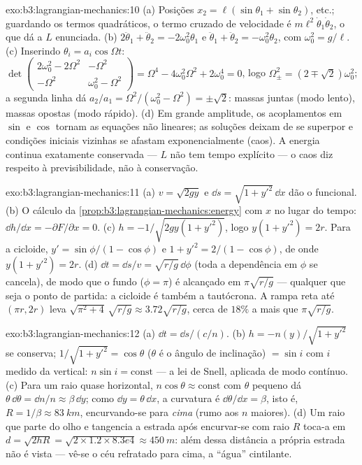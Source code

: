 \begin{solution}{exo:b3:lagrangian-mechanics:10}
(a) Posições $x_2 = \ell(\sin\theta_1 + \sin\theta_2)$, etc.; guardando
os termos quadráticos, o termo cruzado de velocidade é
$m\ell^2\dot\theta_1\dot\theta_2$, o que dá a $L$ enunciada. (b)
$2\ddot\theta_1 + \ddot\theta_2 = -2\omega_0^2\theta_1$ e
$\ddot\theta_1 + \ddot\theta_2 = -\omega_0^2\theta_2$, com $\omega_0^2
= g/\ell$. (c) Inserindo $\theta_i = a_i\cos\Omega t$:
$\det\begin{pmatrix} 2\omega_0^2 - 2\Omega^2 & -\Omega^2\\ -\Omega^2 &
\omega_0^2 - \Omega^2\end{pmatrix} = \Omega^4 - 4\omega_0^2\Omega^2 +
2\omega_0^4 = 0$, logo $\Omega_\pm^2 = (2 \mp \sqrt2)\omega_0^2$; a
segunda linha dá $a_2/a_1 = \Omega^2/(\omega_0^2 - \Omega^2) =
\pm\sqrt2$: massas juntas (modo lento), massas opostas (modo rápido).
(d) Em grande amplitude, os acoplamentos em $\sin$ e $\cos$ tornam as
equações não lineares; as soluções deixam de se superpor e condições
iniciais vizinhas se afastam exponencialmente (caos). A energia
continua exatamente conservada --- $L$ não tem tempo explícito --- o
caos diz respeito à previsibilidade, não à conservação.
\end{solution}

\begin{solution}{exo:b3:lagrangian-mechanics:11}
(a) $v = \sqrt{2gy}$ e $\dd s = \sqrt{1 + y'^2}\,\dd x$ dão o
funcional. (b) O cálculo da
\cref{prop:b3:lagrangian-mechanics:energy} com $x$ no lugar do tempo: $\dd
h/\dd x = -\partial F/\partial x = 0$. (c) $h = -1/\sqrt{2gy(1 +
y'^2)}$, logo $y(1 + y'^2) = 2r$. Para a cicloide, $y' =
\sin\phi/(1 - \cos\phi)$ e $1 + y'^2 = 2/(1 - \cos\phi)$, de onde
$y(1 + y'^2) = 2r$. (d) $\dd t = \dd s/v = \sqrt{r/g}\,\dd\phi$ (toda a
dependência em $\phi$ se cancela), de modo que o fundo ($\phi = \pi$) é
alcançado em $\pi\sqrt{r/g}$ --- qualquer que seja o ponto de partida:
a cicloide é também a tautócrona. A rampa reta até $(\pi r, 2r)$ leva $\sqrt{\pi^2
+ 4}\,\sqrt{r/g} \approx 3.72\sqrt{r/g}$, cerca de $18\%$ a mais que
$\pi\sqrt{r/g}$.
\end{solution}

\begin{solution}{exo:b3:lagrangian-mechanics:12}
(a) $\dd t = \dd s/(c/n)$. (b) $h = -n(y)/\sqrt{1 + y'^2}$ se
conserva; $1/\sqrt{1 + y'^2} = \cos\theta$ ($\theta$ é o ângulo de
inclinação) $= \sin i$ com $i$ medido da vertical: $n\sin i = \text{const}$ ---
a lei de Snell, aplicada de modo contínuo. (c) Para um raio quase
horizontal, $n\cos\theta \approx \text{const}$ com $\theta$ pequeno dá
$\theta\,\dd\theta = \dd n/n \approx \beta\,\dd y$; como $\dd y =
\theta\,\dd x$, a curvatura é $\dd\theta/\dd x = \beta$, isto é, $R =
1/\beta \approx \qty{83}{km}$, encurvando-se para \emph{cima} (rumo aos
$n$ maiores). (d) Um raio que parte do olho e tangencia a estrada após
encurvar-se com raio $R$ toca-a em $d = \sqrt{2hR} = \sqrt{2 \times 1.2 \times
8.3e4} \approx \qty{450}{m}$: além dessa distância a própria estrada
não é vista --- vê-se o céu refratado para cima, a ``água'' cintilante.
\end{solution}

